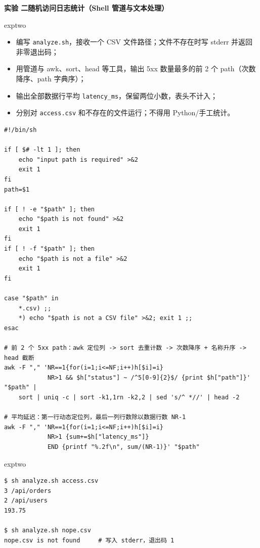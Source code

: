 \documentclass[11pt,a4paper,fontset=none]{ctexart}
\newcommand{\expbanner}[3]{%
  \par\vspace{1.6em}
  \begin{tcolorbox}[enhanced, colback=#1!10, colframe=#1!85!black,
    boxrule=1pt, arc=3pt, left=8pt, right=8pt, top=6pt, bottom=6pt]
    {\Large\bfseries\color{#1!70!black}实验 #2\qquad #3}
  \end{tcolorbox}
  \par\vspace{0.2em}\noindent\ignorespaces
}
\newcommand{\sublabel}[2]{%
  \par\vspace{1em}\noindent{\bfseries\color{#1!75!black}#2}\par\nobreak\vspace{0.25em}\noindent\ignorespaces
}
\begin{document}
\expbanner{exptwo}{二}{随机访问日志统计（Shell 管道与文本处理）}

\begin{reqbox}{exptwo}
\begin{itemize}[leftmargin=1.4em, itemsep=1pt]
  \item 编写 \texttt{analyze.sh}，接收一个 CSV 文件路径；文件不存在时写 stderr 并返回非零退出码；
  \item 用管道与 awk、sort、head 等工具，输出 5xx 数量最多的前 2 个 path（次数降序、path 字典序）；
  \item 输出全部数据行平均 \texttt{latency\_ms}，保留两位小数，表头不计入；
  \item 分别对 \texttt{access.csv} 和不存在的文件运行；不得用 Python/手工统计。
\end{itemize}
\end{reqbox}

\sublabel{exptwo}{\faCode\ analyze.sh}
\begin{lstlisting}[style=shell]
#!/bin/sh

if [ $# -lt 1 ]; then
    echo "input path is required" >&2
    exit 1
fi
path=$1

if [ ! -e "$path" ]; then
    echo "$path is not found" >&2
    exit 1
fi
if [ ! -f "$path" ]; then
    echo "$path is not a file" >&2
    exit 1
fi

case "$path" in
    *.csv) ;;
    *) echo "$path is not a CSV file" >&2; exit 1 ;;
esac

# 前 2 个 5xx path：awk 定位列 -> sort 去重计数 -> 次数降序 + 名称升序 -> head 截断
awk -F "," 'NR==1{for(i=1;i<=NF;i++)h[$i]=i}
            NR>1 && $h["status"] ~ /^5[0-9]{2}$/ {print $h["path"]}' "$path" |
    sort | uniq -c | sort -k1,1rn -k2,2 | sed 's/^ *//' | head -2

# 平均延迟：第一行动态定位列，最后一列行数除以数据行数 NR-1
awk -F "," 'NR==1{for(i=1;i<=NF;i++)h[$i]=i}
            NR>1 {sum+=$h["latency_ms"]}
            END {printf "%.2f\n", sum/(NR-1)}' "$path"
\end{lstlisting}

\begin{resbox}{exptwo}
\begin{lstlisting}[style=output]
$ sh analyze.sh access.csv
3 /api/orders
2 /api/users
193.75

$ sh analyze.sh nope.csv
nope.csv is not found     # 写入 stderr，退出码 1
\end{lstlisting}
\end{resbox}
\end{document}
